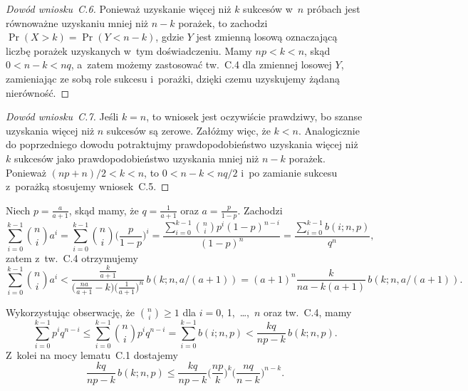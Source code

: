 \exercise %
\begin{proof}[Dowód wniosku~C.6]
	Ponieważ uzyskanie więcej niż $k$ sukcesów w~$n$ próbach jest równoważne uzyskaniu mniej niż $n-k$ porażek, to zachodzi $\Pr(X>k)=\Pr(Y<n-k)$, gdzie $Y$ jest zmienną losową oznaczającą liczbę porażek uzyskanych w~tym doświadczeniu. Mamy $np<k<n$, skąd $0<n-k<nq$, a~zatem możemy zastosować tw.~C.4 dla zmiennej losowej $Y$, zamieniając ze sobą role sukcesu i~porażki, dzięki czemu uzyskujemy żądaną nierówność.
\end{proof}

\begin{proof}[Dowód wniosku~C.7]
	Jeśli $k=n$, to wniosek jest oczywiście prawdziwy, bo szanse uzyskania więcej niż $n$ sukcesów są zerowe. Załóżmy więc, że $k<n$. Analogicznie do poprzedniego dowodu potraktujmy prawdopodobieństwo uzyskania więcej niż $k$ sukcesów jako prawdopodobieństwo uzyskania mniej niż $n-k$ porażek. Ponieważ $(np+n)/2<k<n$, to $0<n-k<nq/2$ i~po zamianie sukcesu z~porażką stosujemy wniosek~C.5.
\end{proof}

\exercise %

\noindent Niech $p=\frac{a}{a+1}$, skąd mamy, że $q=\frac{1}{a+1}$ oraz $a=\frac{p}{1-p}$. Zachodzi
\[
	\sum_{i=0}^{k-1}\binom{n}{i}a^i = \sum_{i=0}^{k-1}\binom{n}{i}\biggl(\frac{p}{1-p}\biggr)^i = \frac{\sum_{i=0}^{k-1}\binom{n}{i}p^i(1-p)^{n-i}}{(1-p)^n} = \frac{\sum_{i=0}^{k-1}b(i;n,p)}{q^n},
\]
zatem z~tw.~C.4 otrzymujemy
\[
	\sum_{i=0}^{k-1}\binom{n}{i}a^i < \frac{\frac{k}{a+1}}{\bigl(\frac{na}{a+1}-k\bigr)\bigl(\frac{1}{a+1}\bigr)^n}\,b(k;n,a/(a+1)) = (a+1)^n\frac{k}{na-k(a+1)}\,b(k;n,a/(a+1)).
\]

\exercise %
Wykorzystując obserwację, że $\binom{n}{i}\ge1$ dla $i=0$, 1,~\dots,~$n$ oraz tw.~C.4, mamy
\[
	\sum_{i=0}^{k-1}p^iq^{n-i} \le \sum_{i=0}^{k-1}\binom{n}{i}p^iq^{n-i} = \sum_{i=0}^{k-1}b(i;n,p) < \frac{kq}{np-k}\,b(k;n,p).
\]
Z~kolei na mocy lematu~C.1 dostajemy
\[
	\frac{kq}{np-k}\,b(k;n,p) \le \frac{kq}{np-k}\biggl(\frac{np}{k}\biggr)^k\biggl(\frac{nq}{n-k}\biggr)^{n-k}.
\]

